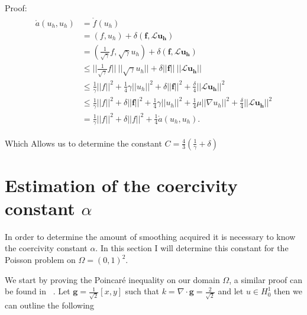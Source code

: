 Proof:
\begin{align}
	\begin{split}
	\mathring{a}(u_h,u_h) &= \mathring{f}(u_h) \\
	&= (f,u_h) + \delta(\mathbf{f},\mathcal{L}\mathbf{u_h}) \\
	&= (\frac{1}{\sqrt{\gamma}}f,\sqrt{\gamma}u_h) + \delta(\mathbf{f},\mathcal{L}\mathbf{u_h}) \\
	&\leq ||\frac{1}{\sqrt{\gamma}}f||\:||\sqrt{\gamma}u_h||+\delta||\mathbf{f}||\:||\mathcal{L}\mathbf{u_h}|| \\
	&\leq \frac{1}{\gamma}||f||^2 + \frac{1}{4}\gamma||u_h||^2 + \delta||\mathbf{f}||^2 + \frac{\delta}{4}||\mathcal{L}\mathbf{u_h}||^2 \\
	&\leq \frac{1}{\gamma}||f||^2 + \delta||\mathbf{f}||^2 + \frac{1}{4}\gamma||u_h||^2 + \frac{1}{4}\mu||\nabla u_h||^2 + \frac{\delta}{4}||\mathcal{L}\mathbf{u_h}||^2 \\
	&= \frac{1}{\gamma}||f||^2 + \delta||f||^2 + \frac{1}{4}\mathring{a}(u_h,u_h).
	\end{split}
	\label{eq:derivationStabilityResult}
\end{align}

Which Allows us to determine the constant $C= \frac{4}{3}(\frac{1}{\gamma}+\delta)$






\section{Estimation of the coercivity constant $\alpha$}

In order to determine the amount of smoothing acquired it is necessary to know the coercivity constant $\alpha$. In this section I will determine this constant for the Poisson problem on $\Omega = (0,1)^2$.

We start by proving the Poincar\'e inequality on our domain $ \Omega $, a similar proof can be found in ~\cite{Quarteroni}. Let $\mathbf{g} = \frac{1}{\sqrt{2}}[x,y]$ such that $k = \nabla \cdot \mathbf{g}=\frac{2}{\sqrt{2}}$ and let $u \in H_0^1$ then we can outline the following


